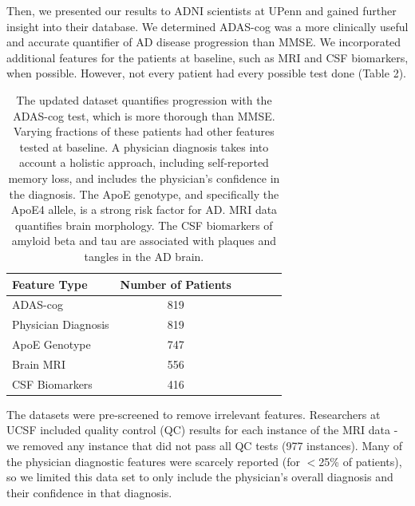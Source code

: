 \documentclass{article}
\begin{document}
Then, we presented our results to ADNI scientists at UPenn and gained further insight into their database. We determined ADAS-cog was a more clinically useful and accurate quantifier of AD disease progression than MMSE.  We incorporated additional features for the patients at baseline, such as MRI and CSF biomarkers, when possible. However, not every patient had every possible test done (Table 2). 

\begin{flushleft}
\begin{table}[h]
\caption{The updated dataset quantifies progression with the ADAS-cog test, which is more thorough than MMSE. Varying fractions of these patients had other features tested at baseline. A physician diagnosis takes into account a holistic approach, including self-reported memory loss, and includes the physician's confidence in the diagnosis. The ApoE genotype, and specifically the ApoE4 allele, is a strong risk factor for AD. MRI data quantifies brain morphology. The CSF biomarkers of amyloid beta and tau are associated with plaques and tangles in the AD brain.}
\label{sample-table}
\vskip 0.15in
\begin{center}
\begin{small}
\begin{sc}
\begin{tabular}{lccccr}
\hline
\abovespace
\belowspace
Feature Type & Number of Patients \\
\hline
\abovespace
\belowspace
ADAS-cog    & 819 \\
\belowspace
Physician Diagnosis    &  819  \\
\belowspace
ApoE Genotype & 747  \\
\belowspace
Brain MRI    &  556 \\
\belowspace
CSF Biomarkers    &  416  \\
\hline
\end{tabular}
\end{sc}
\end{small}
\end{center}
\vskip -0.1in
\end{table}

\end{flushleft}

The datasets were pre-screened to remove irrelevant features. Researchers at UCSF included quality control (QC) results for each instance of the MRI data - we removed any instance that did not pass all QC tests (977 instances). Many of the physician diagnostic features were scarcely reported (for $<$25\% of patients), so we limited this data set to only include the physician's overall diagnosis and their confidence in that diagnosis.\\
\end{document}
